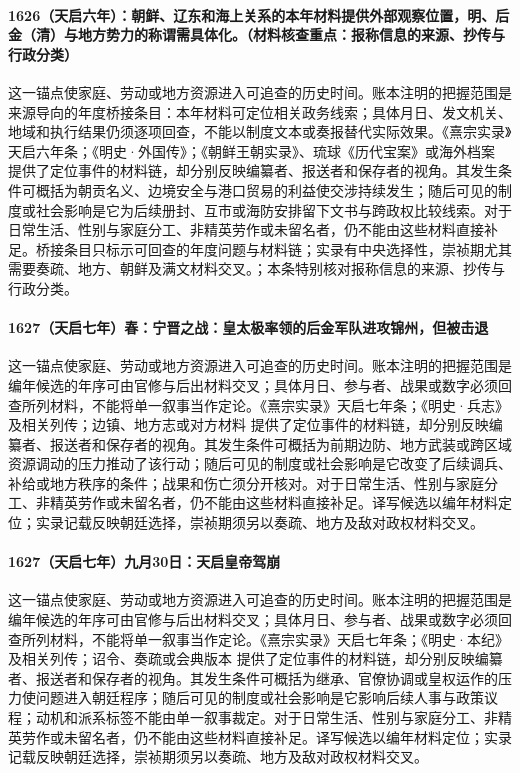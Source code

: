 \paragraph{1626（天启六年）：朝鲜、辽东和海上关系的本年材料提供外部观察位置，明、后金（清）与地方势力的称谓需具体化。（材料核查重点：报称信息的来源、抄传与行政分类）} 这一锚点使家庭、劳动或地方资源进入可追查的历史时间。账本注明的把握范围是来源导向的年度桥接条目：本年材料可定位相关政务线索；具体月日、发文机关、地域和执行结果仍须逐项回查，不能以制度文本或奏报替代实际效果。《熹宗实录》天启六年条；《明史·外国传》；《朝鲜王朝实录》、琉球《历代宝案》或海外档案 提供了定位事件的材料链，却分别反映编纂者、报送者和保存者的视角。其发生条件可概括为朝贡名义、边境安全与港口贸易的利益使交涉持续发生；随后可见的制度或社会影响是它为后续册封、互市或海防安排留下文书与跨政权比较线索。对于日常生活、性别与家庭分工、非精英劳作或未留名者，仍不能由这些材料直接补足。桥接条目只标示可回查的年度问题与材料链；实录有中央选择性，崇祯期尤其需要奏疏、地方、朝鲜及满文材料交叉。；本条特别核对报称信息的来源、抄传与行政分类。

\paragraph{1627（天启七年）春：宁晋之战：皇太极率领的后金军队进攻锦州，但被击退} 这一锚点使家庭、劳动或地方资源进入可追查的历史时间。账本注明的把握范围是编年候选的年序可由官修与后出材料交叉；具体月日、参与者、战果或数字必须回查所列材料，不能将单一叙事当作定论。《熹宗实录》天启七年条；《明史·兵志》及相关列传；边镇、地方志或对方材料 提供了定位事件的材料链，却分别反映编纂者、报送者和保存者的视角。其发生条件可概括为前期边防、地方武装或跨区域资源调动的压力推动了该行动；随后可见的制度或社会影响是它改变了后续调兵、补给或地方秩序的条件；战果和伤亡须分开核对。对于日常生活、性别与家庭分工、非精英劳作或未留名者，仍不能由这些材料直接补足。译写候选以编年材料定位；实录记载反映朝廷选择，崇祯期须另以奏疏、地方及敌对政权材料交叉。

\paragraph{1627（天启七年）九月30日：天启皇帝驾崩} 这一锚点使家庭、劳动或地方资源进入可追查的历史时间。账本注明的把握范围是编年候选的年序可由官修与后出材料交叉；具体月日、参与者、战果或数字必须回查所列材料，不能将单一叙事当作定论。《熹宗实录》天启七年条；《明史·本纪》及相关列传；诏令、奏疏或会典版本 提供了定位事件的材料链，却分别反映编纂者、报送者和保存者的视角。其发生条件可概括为继承、官僚协调或皇权运作的压力使问题进入朝廷程序；随后可见的制度或社会影响是它影响后续人事与政策议程；动机和派系标签不能由单一叙事裁定。对于日常生活、性别与家庭分工、非精英劳作或未留名者，仍不能由这些材料直接补足。译写候选以编年材料定位；实录记载反映朝廷选择，崇祯期须另以奏疏、地方及敌对政权材料交叉。

